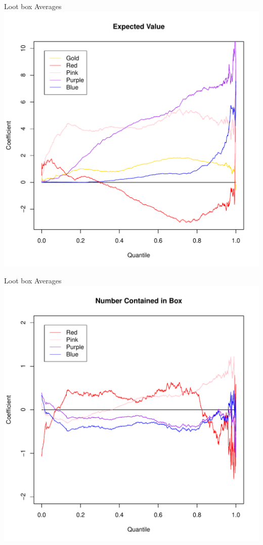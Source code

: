 \documentclass[bigger]{beamer}
\begin{document}
\begin{frame}[label=sec-1-40]{Loot box Averages}
\includegraphics[width=.9\linewidth]{../Plots/QuantRegQuality.pdf}
\end{frame}

\begin{frame}[label=sec-1-41]{Loot box Averages}
\includegraphics[width=.9\linewidth]{../Plots/QuantRegNumInBox.pdf}
\end{frame}
\end{document}
